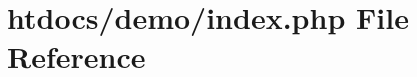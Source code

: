 \hypertarget{demo_2index_8php}{\section{htdocs/demo/index.php File Reference}
\label{demo_2index_8php}
}
